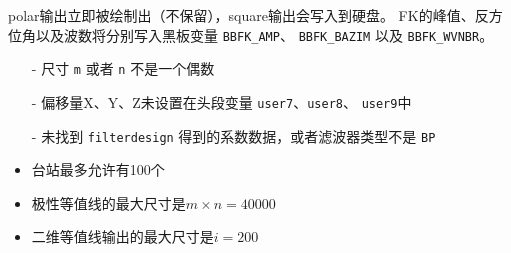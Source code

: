 polar输出立即被绘制出（不保留），square输出会写入到硬盘。
FK的峰值、反方位角以及波数将分别写入黑板变量 \verb|BBFK_AMP|、
\verb|BBFK_BAZIM| 以及 \verb|BBFK_WVNBR|。

\begin{itemize}
\item[-] 尺寸 \texttt{m} 或者 \texttt{n} 不是一个偶数
\item[-] 偏移量X、Y、Z未设置在头段变量 \texttt{user7}、\texttt{user8}、
    \texttt{user9}中
\item[-] 未找到 \texttt{filterdesign} 得到的系数数据，或者滤波器类型不是
    \texttt{BP}
\end{itemize}

\begin{itemize}
\item 台站最多允许有100个
\item 极性等值线的最大尺寸是$m\times n = 40000$
\item 二维等值线输出的最大尺寸是$i = 200$
\end{itemize}
